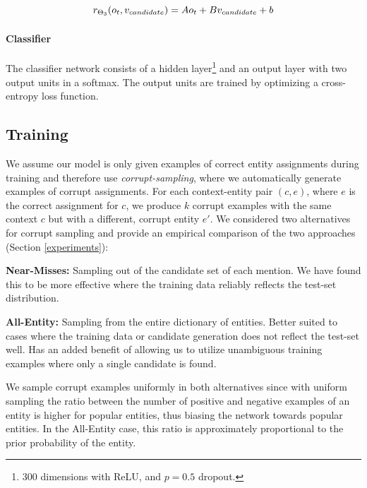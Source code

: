 \documentclass[11pt]{article}
\begin{document}
	\begin{equation}
	\label{eq3}
	r_{\Theta_3}(o_t, v_{candidate}) = Ao_t + Bv_{candidate} + b \\
	\end{equation}
	
	\paragraph{Classifier}
	The classifier network consists of a hidden layer\footnote{300 dimensions with ReLU, and $p=0.5$ dropout.} and an output layer with two output units in a softmax. The output units are trained by optimizing a cross-entropy loss function.
	
	\subsection{Training}
	
	We assume our model is only given examples of correct entity assignments during training and therefore use \textit{corrupt-sampling}, where we automatically generate examples of corrupt assignments. For each context-entity pair $(c,e)$, where $e$ is the correct assignment for $c$, we produce $k$ corrupt examples with the same context $c$ but with a different, corrupt entity $e'$. We considered two alternatives for corrupt sampling and provide an empirical comparison of the two approaches (Section \ref{experiments}):
	
	\begin{description}
	\item{\textbf{Near-Misses:}} 
	Sampling out of the candidate set of each mention. We have found this to be more effective where the training data reliably reflects the test-set distribution.
	\item{\textbf{All-Entity:}} 
	Sampling from the entire dictionary of entities. Better suited to cases where the training data or candidate generation does not reflect the test-set well. Has an added benefit of allowing us to utilize unambiguous training examples where only a single candidate is found.
	\end{description}
	
	We sample corrupt examples uniformly in both alternatives since with uniform sampling the ratio between the number of positive and negative examples of an entity is higher for popular entities, thus biasing the network towards popular entities. In the All-Entity case, this ratio is approximately proportional to the prior probability of the entity. 
	
\end{document}
